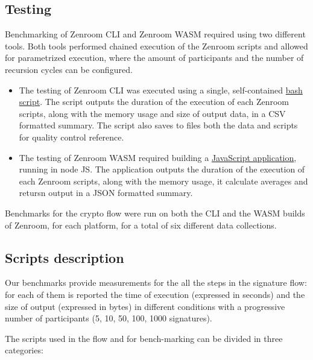 \documentclass[twocolumn]{article}
\begin{document}
\subsection*{Testing}
Benchmarking of Zenroom CLI and Zenroom WASM required using two different tools. Both tools performed chained execution of the Zenroom scripts and allowed for parametrized execution, where the amount of participants and the number of recursion cycles can be configured.  

\begin{itemize}
\item The testing of Zenroom CLI was executed using a single, self-contained \href{https://github.com/dyne/Zenroom/blob/master/test/zencode_reflow/run-recursive.sh}{bash script}. The script outputs the duration of the execution of each Zenroom scripts, along with the memory usage and size of output data, in a CSV formatted summary. The script also saves to files both the data and scripts for quality control reference.

\item The testing of Zenroom WASM required building a \href{https://github.com/dyne/Reflow-Zencode-WASM-benchmark}{JavaScript application}, running in node JS. The application outputs the duration of the execution of each Zenroom scripts, along with the memory usage, it calculate averages and retursn output in a JSON formatted summary.
\end{itemize}

Benchmarks for the crypto flow were run on both the CLI and the WASM builds of Zenroom, for each platform, for a total of six different data collections. 

\subsection*{Scripts description}

Our benchmarks provide measurements for the all the steps in the signature flow: for each of them is reported the time of execution (expressed in seconds) and the size of output (expressed in bytes) in different conditions with a progressive number of participants (5, 10, 50, 100, 1000 signatures).

The scripts used in the flow and for bench-marking can be divided in three categories: 
\end{document}
